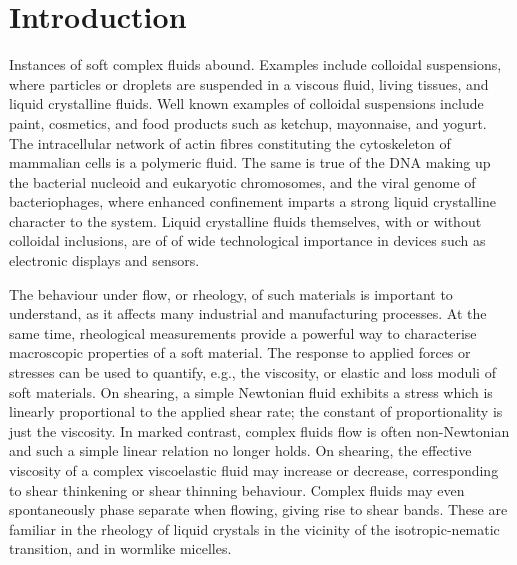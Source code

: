 \documentclass[8.5pt,twoside,twocolumn]{article}
\begin{document}


\section{Introduction}

Instances of soft complex fluids abound. Examples include colloidal
suspensions, where particles or droplets are suspended in a viscous
fluid, living tissues, and liquid crystalline fluids. Well known
examples of colloidal suspensions include paint, cosmetics, and
food products such as ketchup, mayonnaise, and yogurt.
The intracellular network of actin fibres constituting the
cytoskeleton of mammalian cells is a polymeric fluid.
The same is true of the DNA making up the bacterial nucleoid and
eukaryotic chromosomes, and the viral genome of bacteriophages,
where enhanced confinement imparts a strong liquid crystalline
character to the system.
Liquid crystalline fluids themselves, with or without colloidal
inclusions, are of of wide technological importance in devices
such as electronic displays and sensors.

The behaviour under flow, or rheology, of such materials is important
to understand, as it affects many industrial and manufacturing processes.
At the same time, rheological measurements provide a powerful way to
characterise macroscopic properties of a soft material.
The response to applied forces or stresses can be used to quantify,
e.g., the viscosity, or elastic and loss moduli of soft materials.
On shearing, a simple Newtonian fluid exhibits a stress which is
linearly proportional to the applied shear rate; the
constant of proportionality is just the viscosity. In marked
contrast, complex fluids flow is often non-Newtonian and such a simple
linear relation no longer holds. On shearing, the effective viscosity
of a complex viscoelastic fluid may increase or decrease, corresponding
to shear thinkening or shear thinning behaviour. Complex fluids may even
spontaneously phase separate when flowing, giving rise to shear bands.
These are familiar in the rheology of liquid crystals in the vicinity of
the isotropic-nematic transition, and in wormlike micelles.
\end{document}
